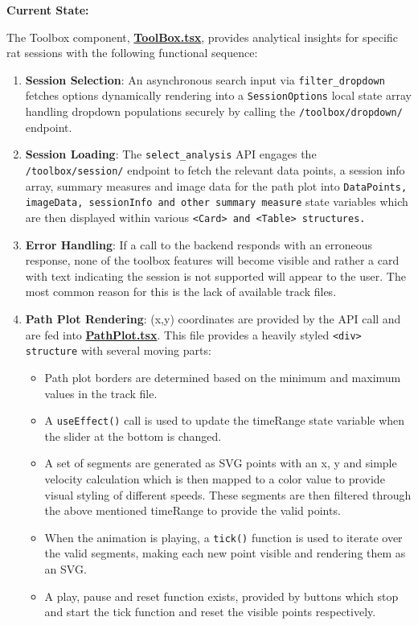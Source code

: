 \documentclass{article}
\begin{document}
\par{\textbf{Current State:}}
\par{The Toolbox component, \href{https://github.com/OCD-Rats-Capstone/OCD-Rat-Infrastructure/blob/main/src/ocd-rat-frontend/src/pages/ToolBox.tsx}{\textbf{ToolBox.tsx}}, provides analytical insights for specific rat sessions with the following functional sequence:}

\begin{enumerate}

  \item{\textbf{Session Selection}: An asynchronous search input via \texttt{filter\_dropdown} fetches options dynamically rendering into a \texttt{SessionOptions} local state array handling dropdown populations securely by calling the \texttt{/toolbox/dropdown/} endpoint.}
  \item{\textbf{Session Loading}: The \texttt{select\_analysis} API engages the \texttt{/toolbox/session/} endpoint to fetch the relevant data points, a session info array, summary measures and image data for the path plot into \texttt{DataPoints, imageData, sessionInfo and other summary measure} state variables which
  are then displayed within various \texttt{<Card>  and <Table> structures.}}
  \item{\textbf{Error Handling}: If a call to the backend responds with an erroneous response, none of the toolbox features will become visible and rather a card with text indicating the session is not supported will appear to the user.
  The most common reason for this is the lack of available track files.}
  \item{\textbf{Path Plot Rendering}: (x,y) coordinates are provided by the API call and are fed into \href{https://github.com/OCD-Rats-Capstone/OCD-Rat-Infrastructure/blob/main/src/ocd-rat-frontend/src/pages/PathPlot.tsx}{\textbf{PathPlot.tsx}}. This file
  provides a heavily styled \texttt{<div> structure} with several moving parts:
    \begin{itemize}
      \item{Path plot borders are determined based on the minimum and maximum values in the track file.}
      \item{A \texttt{useEffect()} call is used to update the timeRange state variable when the slider at the bottom is changed.}
      \item{A set of segments are generated as SVG points with an x, y and simple velocity calculation which is then mapped to a color value to provide visual 
      styling of different speeds. These segments are then filtered through the above mentioned timeRange to provide the valid points.}
      \item{When the animation is playing, a \texttt{tick()} function is used to iterate over the valid segments, making each new
      point visible and rendering them as an SVG.}
      \item{A play, pause and reset function exists, provided by buttons which stop and start the tick function and reset the visible points respectively.}
    \end{itemize}}

\end{enumerate}
\end{document}
